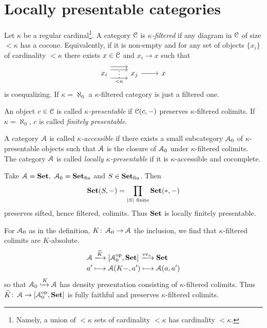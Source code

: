 \documentclass[a4paper,11pt,oneside,openany]{scrbook}
\begin{document}
\section{Locally presentable categories}
\begin{defn}
    Let $\kappa$ be a regular cardinal\footnote{Namely, a union of $<\kappa$ sets of cardinality $<\kappa$ has cardinality $<\kappa$.}. A category $\operatorname{\mathcal{C}}$ is \emph{$\kappa$-filtered} if any diagram in $\operatorname{\mathcal{C}}$ of size $<\kappa$ has a cocone. Equivalently, if it is non-empty and for any set of objects $\{x_i\}$ of cardinality $<\kappa$ there exists $x\in\operatorname{\mathcal{C}}$ and $x_i\to x$ such that
    \[
    \begin{tikzcd}
 x_i\arrow[r,shift left=2.2ex] \arrow[r,shift left=1.2ex,""{name=A}] \arrow[r, shift right=1.5ex,"<\kappa"',""{name=B}]\ar[from=A, to=B, phantom, "\vdots"]&x_j \arrow[r]&x 
\end{tikzcd}
    \]
is coequalizing. If $\kappa=\aleph_0$ a $\kappa$-filtered category is just a filtered one.    
\end{defn}
\begin{defn}
An object $c\in\operatorname{\mathcal{C}}$ is called \emph{$\kappa$-presentable} if $\operatorname{\mathcal{C}}(c,-)$ preserves $\kappa$-filtered colimits. If $\kappa=\aleph_0$, $c$ is called \emph{finitely presentable}. 
\end{defn}
\begin{defn}
A category $\operatorname{\mathcal{A}}$ is called \emph{$\kappa$-accessible} if there exists a small subcategory $\operatorname{\mathcal{A}}_0$ of $\kappa$-presentable objects such that $\operatorname{\mathcal{A}}$ is the closure of $\operatorname{\mathcal{A}}_0$ under $\kappa$-filtered colimits. The category $\operatorname{\mathcal{A}}$ is called \emph{locally $\kappa$-presentable} if it is $\kappa$-accessible and cocomplete. 
\end{defn}
\begin{exmp}
Take $\A=\Set,\ \A_0=\Set_\text{fin}$ and $S\in{\normalfont\textbf{Set}}_\text{fin}$. Then $$\Set(S,-)=\displaystyle\prod_{|S| \ \text{finite}}\Set(*,-)$$
preserves sifted, hence filtered, colimits. Thus ${\normalfont\textbf{Set}}$ is locally finitely presentable.
\end{exmp}
\begin{rmk}
    For $\operatorname{\mathcal{A}}_0$ as in the definition, $K\colon\operatorname{\mathcal{A}}_0\to\operatorname{\mathcal{A}}$ the inclusion, we find that $\kappa$-filtered colimits are $K$-absolute.
    \begin{align*}
    \A&\xlongrightarrow{\widetilde{K}}\left[\A_0^{\op},\Set\right]\xlongrightarrow{\text{ev}_a}\Set\\
    a'&\longmapsto\A(K-,a')\longmapsto\A(a,a')
    \end{align*}
so that $\operatorname{\mathcal{A}}_0\xhookrightarrow{K}\operatorname{\mathcal{A}}$ has density presentation consisting of $\kappa$-filtered colimits. Thus $\widetilde{K}\colon\operatorname{\mathcal{A}}\to\left[\operatorname{\mathcal{A}}_0^{\operatorname{\text{op}}},{\normalfont\textbf{Set}}\right]$ is fully faithful and preserves $\kappa$-filtered colimits.
\end{rmk}
\end{document}
